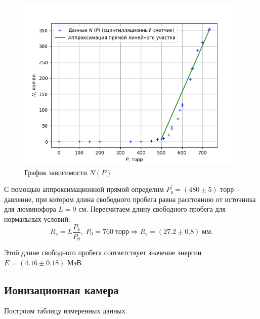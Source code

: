 \documentclass[a4paper, 12pt]{article}%
\begin{document}
    \begin{figure}[!h]
        \centering
        \includegraphics[width = 14 cm]{graph_2}
        \caption{График зависимости $N(P)$}
        \label{}
    \end{figure}

    С помощью аппроксимационной прямой определим $P_{\text{э}}^{\text{'}} = (480 \pm 5)$ торр -- давление, при котором длина свободного пробега равна расстоянию от источника для люминофора $L = 9$ см. Пересчитаем длину свободного пробега для нормальных условий:
    \begin{equation}
        R_{\text{э}} = L \frac{P_{\text{э}}}{P_0}, \; P_0 = 760 \; \text{торр} \Rightarrow R_{\text{э}} = (27.2 \pm 0.8) \; \text{мм}.
    \end{equation}

    Этой длине свободного пробега соответствует значение энергии $E = (4.16 \pm 0.18)$ МэВ.

\subsection{Ионизационная камера}

    Построим таблицу измеренных данных.
\end{document}
